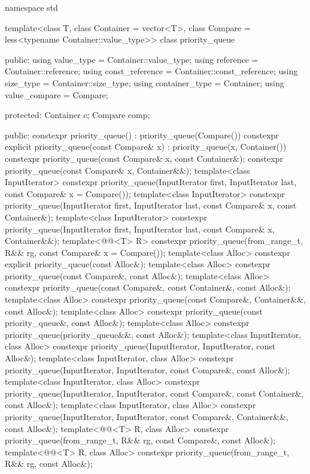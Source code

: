 \begin{codeblock}
namespace std {
  template<class T, class Container = vector<T>,
           class Compare = less<typename Container::value_type>>
  class priority_queue {
  public:
    using value_type      = Container::value_type;
    using reference       = Container::reference;
    using const_reference = Container::const_reference;
    using size_type       = Container::size_type;
    using container_type  = Container;
    using value_compare   = Compare;

  protected:
    Container c;
    Compare comp;

  public:
    constexpr priority_queue() : priority_queue(Compare()) {}
    constexpr explicit priority_queue(const Compare& x) : priority_queue(x, Container()) {}
    constexpr priority_queue(const Compare& x, const Container&);
    constexpr priority_queue(const Compare& x, Container&&);
    template<class InputIterator>
      constexpr priority_queue(InputIterator first, InputIterator last,
                               const Compare& x = Compare());
    template<class InputIterator>
      constexpr priority_queue(InputIterator first, InputIterator last, const Compare& x,
                               const Container&);
    template<class InputIterator>
      constexpr priority_queue(InputIterator first, InputIterator last, const Compare& x,
                               Container&&);
    template<@@<T> R>
      constexpr priority_queue(from_range_t, R&& rg, const Compare& x = Compare());
    template<class Alloc> constexpr explicit priority_queue(const Alloc&);
    template<class Alloc> constexpr priority_queue(const Compare&, const Alloc&);
    template<class Alloc>
      constexpr priority_queue(const Compare&, const Container&, const Alloc&);
    template<class Alloc> constexpr priority_queue(const Compare&, Container&&, const Alloc&);
    template<class Alloc> constexpr priority_queue(const priority_queue&, const Alloc&);
    template<class Alloc> constexpr priority_queue(priority_queue&&, const Alloc&);
    template<class InputIterator, class Alloc>
      constexpr priority_queue(InputIterator, InputIterator, const Alloc&);
    template<class InputIterator, class Alloc>
      constexpr priority_queue(InputIterator, InputIterator, const Compare&, const Alloc&);
    template<class InputIterator, class Alloc>
      constexpr priority_queue(InputIterator, InputIterator, const Compare&, const Container&,
                               const Alloc&);
    template<class InputIterator, class Alloc>
      constexpr priority_queue(InputIterator, InputIterator, const Compare&, Container&&,
                               const Alloc&);
    template<@@<T> R, class Alloc>
      constexpr priority_queue(from_range_t, R&& rg, const Compare&, const Alloc&);
    template<@@<T> R, class Alloc>
      constexpr priority_queue(from_range_t, R&& rg, const Alloc&);

}}
\end{codeblock}
